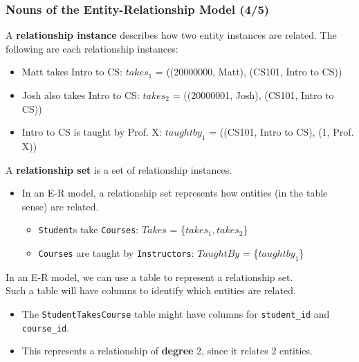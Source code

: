 \begin{frame}
\frametitle{Nouns of the Entity-Relationship Model (4/5)}

A \textbf{relationship instance} describes how two entity instances are related. The following are each relationship instances:
\begin{itemize}
  \item Matt takes Intro to CS: $takes_1$ = ((20000000, Matt), (CS101, Intro to CS))
  \item Josh also takes Intro to CS: $takes_2$ = ((20000001, Josh), (CS101, Intro to CS))
  \item Intro to CS is taught by Prof. X: $taughtby_1$ = ((CS101, Intro to CS), (1, Prof. X))
\end{itemize}


A \textbf{relationship set} is a set of relationship instances.\\
\begin{itemize}
  \item In an E-R model, a relationship set represents how entities (in the table sense) are related.
  \begin{itemize}
    \item \texttt{Student}s take \texttt{Courses}: $Takes$ = \{$takes_1, takes_2$\}
    \item \texttt{Courses} are taught by \texttt{Instructors}: $TaughtBy$ = \{$taughtby_1$\}
  \end{itemize}
\end{itemize}

In an E-R model, we can use a table to represent a relationship set.\\
Such a table will have columns to identify which entities are related.\\
\begin{itemize}
  \item The \texttt{StudentTakesCourse} table might have columns for \texttt{student\_id} and \texttt{course\_id}.
  \item This represents a relationship of \textbf{degree} 2, since it relates 2 entities.
\end{itemize}

\end{frame}


